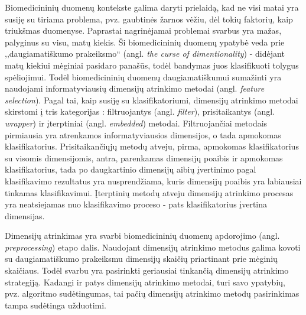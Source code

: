 Biomedicininių duomenų kontekste galima daryti prielaidą, kad ne visi matai yra susiję su tiriama problema, pvz. gaubtinės žarnos vėžiu, dėl tokių faktorių, kaip triukšmas duomenyse. Paprastai nagrinėjamai problemai svarbus yra mažas, palyginus su visu, matų kiekis. Ši biomedicininių duomenų ypatybė veda prie ,,daugiamatiškumo prakeiksmo`` (angl. \textit{the curse of dimentionality}) \cite{bellman1966adaptive} - didėjant matų kiekiui mėginiai pasidaro panašūs, todėl bandymas juos klasifikuoti tolygus spėliojimui. Todėl biomedicininių duomenų daugiamatiškumui sumažinti yra naudojami informatyviausių dimensijų atrinkimo metodai \cite{guyon2003introduction} (angl. \textit{feature selection}). Pagal tai, kaip susiję su klasifikatoriumi, dimensijų atrinkimo metodai skirstomi į tris kategorijas \cite{saeys2008robust}: filtruojantys (angl. \textit{filter}), prisitaikantys (angl. \textit{wrapper}) ir įterptiniai (angl. \textit{embedded}) metodai. Filtruojančiai metodais pirmiausia yra atrenkamos informatyviausios 
dimensijos, o tada apmokomas klasifikatorius. Prisitaikančiųjų metodų atveju, pirma, apmokomas klasifikatorius su visomis dimensijomis, antra, parenkamas dimensijų poaibis ir apmokomas klasifikatorius, tada po daugkartinio dimensijų aibių įvertinimo pagal klasifikavimo rezultatus yra nusprendžiama, kuris dimensijų poaibis yra labiausiai tinkamas klasifikavimui. Įterptinių metodų atveju dimensijų atrinkimo procesas yra neatsiejamas nuo klasifikavimo proceso - pats klasifikatorius įvertina dimensijas.

Dimensijų atrinkimas yra svarbi biomedicininių duomenų apdorojimo (angl. \textit{preprocessing}) etapo dalis. Naudojant dimensijų atrinkimo metodus galima kovoti su daugiamatiškumo prakeiksmu dimensijų skaičių priartinant prie mėginių skaičiaus. Todėl svarbu yra pasirinkti geriausiai tinkančią dimensijų atrinkimo strategiją. Kadangi ir patys dimensijų atrinkimo metodai, turi savo ypatybių, pvz. algoritmo sudėtingumas, tai pačių dimensijų atrinkimo metodų pasirinkimas tampa sudėtinga užduotimi.

